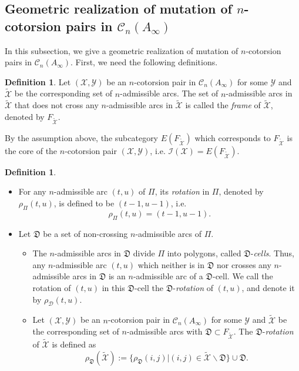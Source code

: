 \documentclass[a4paper,reqno,11pt]{amsart}
\theoremstyle{definition}
\newtheorem{definition}[theorem]{Definition}
\def\C{\mathcal{C}}
\def\D{\mathcal{D}}
\def\X{\mathcal{X}}
\def\D{\mathcal{D}}
\def\Y{\mathcal{Y}}
\def\I{\mathcal {I}}
\def\XX{\widetilde{\X}}
\begin{document}
\subsection{Geometric realization of mutation of $n$-cotorsion pairs in $\C_n(A_{\infty})$}
In this subsection, we give a geometric realization of mutation of $n$-cotorsion pairs in $\C_n(A_{\infty})$. First, we need the following definitions.
\begin{definition}
Let $(\X,\Y)$ be an $n$-cotorsion pair in $\C_n(A_{\infty})$ for some $\Y$ and $\XX$ be the corresponding set of $n$-admissible arcs. The set of $n$-admissible arcs in $\XX$ that does not cross any $n$-admissible arcs in $\XX$ is called the \emph{frame} of $\XX$, denoted by $F_{\XX}$.
\end{definition}
By the assumption above, the subcategory $E(F_{\XX})$ which corresponds to $F_{\XX}$ is the core of the $n$-cotorsion pair $(\X,\Y)$, i.e. $\I(\X)=E(F_{\XX})$.
\begin{definition}
\begin{itemize}
\item [(1)] For any $n$-admissible arc $(t,u)$ of $\Pi$, its \emph{rotation} in $\Pi$, denoted by $\rho_{\Pi}(t,u)$, is defined to be $(t-1,u-1)$, i.e.
      $$\rho_{\Pi}(t,u)=(t-1,u-1).$$
\item [(2)] Let $\mathfrak{D}$ be a set of non-crossing $n$-admissible arcs of $\Pi$.
\begin{itemize}
  \item [(i)] The $n$-admissible arcs in $\mathfrak{D}$ divide $\Pi$ into polygons, called $\mathfrak{D}$-\emph{cells}. Thus, any $n$-admissible arc $(t,u)$ which neither is in $\mathfrak{D}$ nor crosses any $n$-admissible arcs in $\mathfrak{D}$ is an $n$-admissible arc of a $\mathfrak{D}$-cell. We call the rotation of $(t,u)$ in this $\mathfrak{D}$-cell the $\mathfrak{D}$-\emph{rotation} of $(t,u)$, and denote it by $\rho_{\D}(t,u)$.
  \item [(ii)] Let $(\X,\Y)$ be an $n$-cotorsion pair in $\C_n(A_{\infty})$ for some $\Y$ and $\XX$ be the corresponding set of $n$-admissible arcs with $\mathfrak{D}\subset F_{\XX}$. The $\mathfrak{D}$-\emph{rotation} of $\XX$ is defined as
      $$\rho_{\mathfrak{D}}(\XX):=\{\rho_{\mathfrak{D}}(i,j)|(i,j)\in\XX\backslash\mathfrak{D}\}\cup\mathfrak{D}.$$
\end{itemize}
\end{itemize}
\end{definition}
\end{document}
